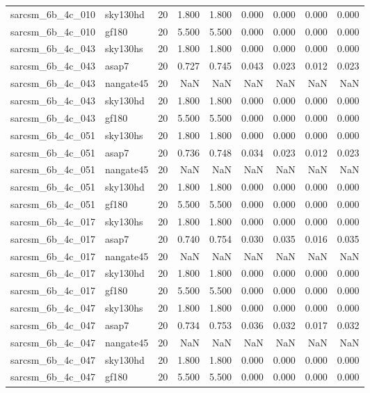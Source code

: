 \begin{tabular}{llrrrrrrr}
sarcsm\_6b\_4c\_010 & sky130hd & 20 & 1.800 & 1.800 & 0.000 & 0.000 & 0.000 & 0.000 \\
sarcsm\_6b\_4c\_010 & gf180 & 20 & 5.500 & 5.500 & 0.000 & 0.000 & 0.000 & 0.000 \\
sarcsm\_6b\_4c\_043 & sky130hs & 20 & 1.800 & 1.800 & 0.000 & 0.000 & 0.000 & 0.000 \\
sarcsm\_6b\_4c\_043 & asap7 & 20 & 0.727 & 0.745 & 0.043 & 0.023 & 0.012 & 0.023 \\
sarcsm\_6b\_4c\_043 & nangate45 & 20 & NaN & NaN & NaN & NaN & NaN & NaN \\
sarcsm\_6b\_4c\_043 & sky130hd & 20 & 1.800 & 1.800 & 0.000 & 0.000 & 0.000 & 0.000 \\
sarcsm\_6b\_4c\_043 & gf180 & 20 & 5.500 & 5.500 & 0.000 & 0.000 & 0.000 & 0.000 \\
sarcsm\_6b\_4c\_051 & sky130hs & 20 & 1.800 & 1.800 & 0.000 & 0.000 & 0.000 & 0.000 \\
sarcsm\_6b\_4c\_051 & asap7 & 20 & 0.736 & 0.748 & 0.034 & 0.023 & 0.012 & 0.023 \\
sarcsm\_6b\_4c\_051 & nangate45 & 20 & NaN & NaN & NaN & NaN & NaN & NaN \\
sarcsm\_6b\_4c\_051 & sky130hd & 20 & 1.800 & 1.800 & 0.000 & 0.000 & 0.000 & 0.000 \\
sarcsm\_6b\_4c\_051 & gf180 & 20 & 5.500 & 5.500 & 0.000 & 0.000 & 0.000 & 0.000 \\
sarcsm\_6b\_4c\_017 & sky130hs & 20 & 1.800 & 1.800 & 0.000 & 0.000 & 0.000 & 0.000 \\
sarcsm\_6b\_4c\_017 & asap7 & 20 & 0.740 & 0.754 & 0.030 & 0.035 & 0.016 & 0.035 \\
sarcsm\_6b\_4c\_017 & nangate45 & 20 & NaN & NaN & NaN & NaN & NaN & NaN \\
sarcsm\_6b\_4c\_017 & sky130hd & 20 & 1.800 & 1.800 & 0.000 & 0.000 & 0.000 & 0.000 \\
sarcsm\_6b\_4c\_017 & gf180 & 20 & 5.500 & 5.500 & 0.000 & 0.000 & 0.000 & 0.000 \\
sarcsm\_6b\_4c\_047 & sky130hs & 20 & 1.800 & 1.800 & 0.000 & 0.000 & 0.000 & 0.000 \\
sarcsm\_6b\_4c\_047 & asap7 & 20 & 0.734 & 0.753 & 0.036 & 0.032 & 0.017 & 0.032 \\
sarcsm\_6b\_4c\_047 & nangate45 & 20 & NaN & NaN & NaN & NaN & NaN & NaN \\
sarcsm\_6b\_4c\_047 & sky130hd & 20 & 1.800 & 1.800 & 0.000 & 0.000 & 0.000 & 0.000 \\
sarcsm\_6b\_4c\_047 & gf180 & 20 & 5.500 & 5.500 & 0.000 & 0.000 & 0.000 & 0.000 \\

\end{tabular}
